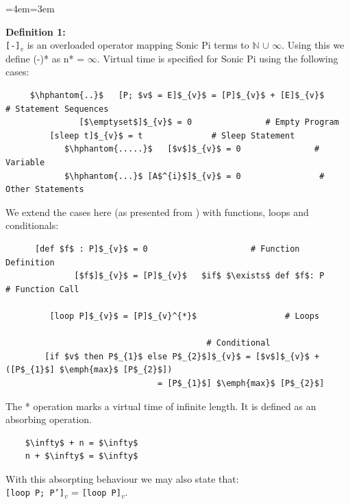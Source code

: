 \documentclass[11pt, abstracton, twoside, titlepage=true]{scrartcl}
\newenvironment{blockquote}{
	\par
	\medskip
	\leftskip=4em\rightskip=3em
	\noindent\ignorespaces
}{
	\par\medskip
}
\begin{document}
\begin{blockquote}
	\textbf{Definition 1:} \\ 
	\texttt{[-]$_{v}$} is an overloaded operator mapping Sonic Pi terms to $\mathbb{N}$
	$\cup$ {$\infty$}. Using this we define (-)* as n* = $\infty$. Virtual time is specified for Sonic Pi using the following cases:
	\\
	\begin{lstlisting}
     $\hphantom{..}$   [P; $v$ = E]$_{v}$ = [P]$_{v}$ + [E]$_{v}$       # Statement Sequences
               [$\emptyset$]$_{v}$ = 0               # Empty Program
         [sleep t]$_{v}$ = t              # Sleep Statement
            $\hphantom{.....}$   [$v$]$_{v}$ = 0               # Variable
            $\hphantom{...}$ [A$^{i}$]$_{v}$ = 0                # Other Statements
	\end{lstlisting}

	We extend the cases here (as presented from \cite{AOB14}) with functions, loops
	and conditionals:
	\\
	\begin{lstlisting}
      [def $f$ : P]$_{v}$ = 0                     # Function Definition 
              [$f$]$_{v}$ = [P]$_{v}$   $if$ $\exists$ def $f$: P       # Function Call

         [loop P]$_{v}$ = [P]$_{v}^{*}$                  # Loops

                                         # Conditional
        [if $v$ then P$_{1}$ else P$_{2}$]$_{v}$ = [$v$]$_{v}$ + ([P$_{1}$] $\emph{max}$ [P$_{2}$])
                               = [P$_{1}$] $\emph{max}$ [P$_{2}$]
	\end{lstlisting}

	The * operation marks a virtual time of infinite length. It is defined as an 
	absorbing operation. 
	\\
	\begin{lstlisting}
	$\infty$ + n = $\infty$
	n + $\infty$ = $\infty$
	\end{lstlisting}

	With this absorpting behaviour we may also state that: \\
	 \texttt{[loop P; P']$_{v}$} = \texttt{[loop P]$_{v}$}.
\end{blockquote}
\end{document}
